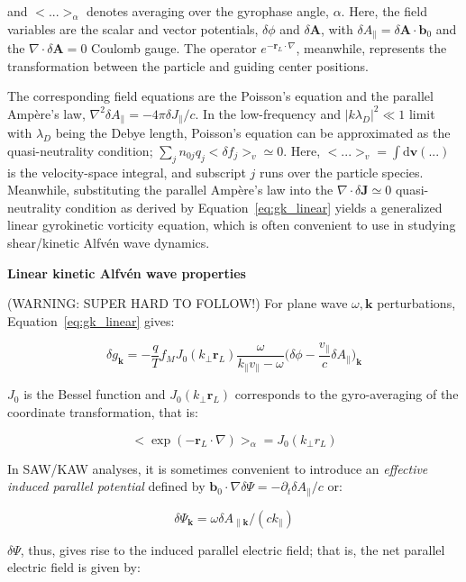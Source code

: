 \documentclass[
  notoc %
]{tufte-book}
\begin{document}
and \(<...>_\alpha\) denotes averaging over the gyrophase angle,
\(\alpha\). Here, the field variables are the scalar and vector
potentials, \(\delta\phi\) and \(\delta\mathbf{A}\), with
\(\delta A_\parallel=\delta\mathbf{A}\cdot\mathbf{b}_0\) and the
\(\nabla\cdot\delta\mathbf{A}=0\) Coulomb gauge. The operator
\(e^{-\mathbf{r}_L\cdot\nabla}\), meanwhile, represents the
transformation between the particle and guiding center positions.

The corresponding field equations are the Poisson's equation and the
parallel Ampère's law,
\(\nabla^2 \delta A_\parallel = -4\pi\delta J_\parallel/c\). In the
low-frequency and \(|k\lambda_D|^2\ll 1\) limit with \(\lambda_D\) being
the Debye length, Poisson's equation can be approximated as the
quasi-neutrality condition; \(\sum_j n_{0j}q_j<\delta f_j>_v\simeq 0\).
Here, \(<...>_v = \int \mathrm{d}\mathbf{v} (...)\) is the
velocity-space integral, and subscript \(j\) runs over the particle
species. Meanwhile, substituting the parallel Ampère's law into the
\(\nabla\cdot\delta\mathbf{J}\simeq 0\) quasi-neutrality condition as
derived by Equation~\ref{eq:gk_linear} yields a generalized linear
gyrokinetic vorticity equation, which is often convenient to use in
studying shear/kinetic Alfvén wave dynamics.

\textbf{Linear kinetic Alfvén wave properties}

(WARNING: SUPER HARD TO FOLLOW!) For plane wave \(\omega,\mathbf{k}\)
perturbations, Equation~\ref{eq:gk_linear} gives:

\[
\delta g_\mathbf{k} = -\frac{q}{T}f_M J_0(k_\perp \mathbf{r}_L) \frac{\omega}{k_\parallel v_\parallel - \omega}\Big( \delta\phi - \frac{v_\parallel}{c}\delta A_\parallel \Big)_\mathbf{k}
\]

\(J_0\) is the Bessel function and \(J_0(k_\perp \mathbf{r}_L)\)
corresponds to the gyro-averaging of the coordinate transformation, that
is:

\[
<\exp(-\mathbf{r}_L\cdot\nabla)>_\alpha = J_0(k_\perp r_L)
\]

In SAW/KAW analyses, it is sometimes convenient to introduce an
\emph{effective induced parallel potential} defined by
\(\mathbf{b}_0\cdot\nabla\delta\Psi = -\partial_t \delta A_\parallel/c\)
or:

\[
\delta\Psi_\mathbf{k} = \omega\delta A_{\parallel\mathbf{k}} / (ck_\parallel)
\]

\(\delta\Psi\), thus, gives rise to the induced parallel electric field;
that is, the net parallel electric field is given by:
\end{document}
